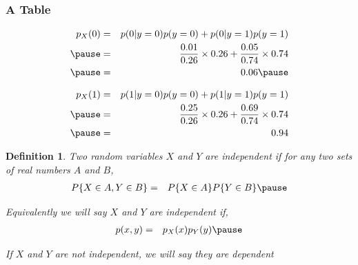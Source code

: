 \documentclass{beamer}
\newtheorem{defn}{Definition}
\numberwithin{equation}{section}
\begin{document}
\begin{frame}
\frametitle{A Table} 




\begin{eqnarray}
p_{X}(0) & = & p(0|y = 0) p(y= 0) + p(0|y=1) p(y=1) \nonumber \\ \pause
& = & \frac{0.01}{0.26} \times 0.26 + \frac{0.05}{0.74} \times 0.74 \nonumber \\\pause
& = & 0.06 \nonumber \pause
\end{eqnarray}

\begin{eqnarray}
p_{X}(1) & = & p(1|y = 0) p(y= 0) + p(1|y=1) p(y=1) \nonumber \\\pause
& = & \frac{0.25}{0.26} \times 0.26 + \frac{0.69}{0.74} \times 0.74 \nonumber \\\pause
& = & 0.94\nonumber 
\end{eqnarray}



\end{frame}


\begin{frame}

\begin{defn} 
Two random variables $X$ and $Y$ are independent if for any two sets of real numbers $A$ and $B$, \pause 
\begin{eqnarray}
P\{ X \in A , Y \in B \} & = & P\{X \in A\} P\{Y \in B\} \nonumber \pause  
\end{eqnarray}

Equivalently we will say $X$ and $Y$ are independent if,  \pause 
\begin{eqnarray}
p(x,y) & = & p_{X}(x) p_{Y}(y) \nonumber  \pause 
\end{eqnarray}

If $X$ and $Y$ are not independent, we will say they are \alert{dependent} 

\end{defn}

\end{frame}
\end{document}
